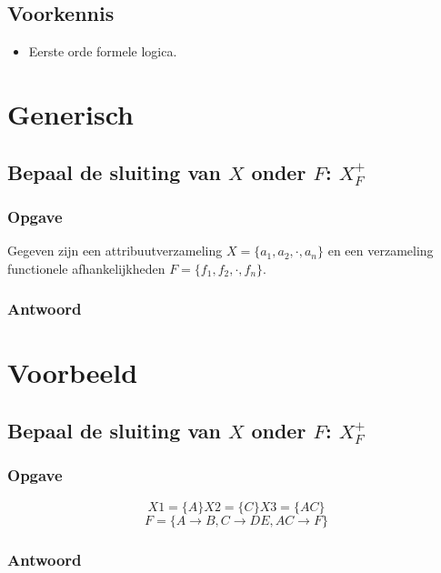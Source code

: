 \documentclass[10pt,a4paper,oneside]{report}
\theoremstyle{plain}
\theoremstyle{definition}
\begin{document}



\tableofcontents
\pagebreak


%
%


\section*{Voorkennis}
\begin{itemize}
\item Eerste orde formele logica.
\end{itemize}



\chapter{Generisch}
\renewcommand\thesection{Vraag \arabic{section}}
\renewcommand\thesubsection{V \arabic{section}}
\section{Bepaal de sluiting van $X$ onder $F$: $X_{F}^{+}$}
\subsection{Opgave}
Gegeven zijn een attribuutverzameling $X = \{a_1,a_2,\cdot,a_n\}$ en een verzameling functionele afhankelijkheden $F=  \{f_1,f_2,\cdot,f_n\}$.
\subsection{Antwoord}

\chapter{Voorbeeld}
\section{Bepaal de sluiting van $X$ onder $F$: $X_{F}^{+}$}
\subsection{Opgave}
\[
X1 = \{A\}
X2 = \{C\}
X3 = \{AC\}
\]
\[
F = 
\{
  A\rightarrow B
, C\rightarrow DE
, AC \rightarrow F
\}
\]

\subsection{Antwoord}
\[
\]
\end{document}
